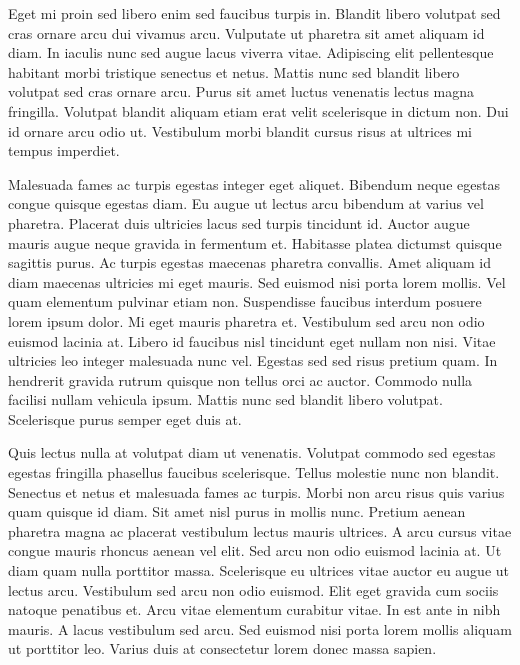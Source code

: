 \documentclass[11pt,a4paper]{article}
\begin{document}
Eget mi proin sed libero enim sed faucibus turpis in. Blandit libero volutpat sed cras ornare arcu dui vivamus arcu. Vulputate ut pharetra sit amet aliquam id diam. In iaculis nunc sed augue lacus viverra vitae. Adipiscing elit pellentesque habitant morbi tristique senectus et netus. Mattis nunc sed blandit libero volutpat sed cras ornare arcu. Purus sit amet luctus venenatis lectus magna fringilla. Volutpat blandit aliquam etiam erat velit scelerisque in dictum non. Dui id ornare arcu odio ut. Vestibulum morbi blandit cursus risus at ultrices mi tempus imperdiet.

Malesuada fames ac turpis egestas integer eget aliquet. Bibendum neque egestas congue quisque egestas diam. Eu augue ut lectus arcu bibendum at varius vel pharetra. Placerat duis ultricies lacus sed turpis tincidunt id. Auctor augue mauris augue neque gravida in fermentum et. Habitasse platea dictumst quisque sagittis purus. Ac turpis egestas maecenas pharetra convallis. Amet aliquam id diam maecenas ultricies mi eget mauris. Sed euismod nisi porta lorem mollis. Vel quam elementum pulvinar etiam non. Suspendisse faucibus interdum posuere lorem ipsum dolor. Mi eget mauris pharetra et. Vestibulum sed arcu non odio euismod lacinia at. Libero id faucibus nisl tincidunt eget nullam non nisi. Vitae ultricies leo integer malesuada nunc vel. Egestas sed sed risus pretium quam. In hendrerit gravida rutrum quisque non tellus orci ac auctor. Commodo nulla facilisi nullam vehicula ipsum. Mattis nunc sed blandit libero volutpat. Scelerisque purus semper eget duis at.

Quis lectus nulla at volutpat diam ut venenatis. Volutpat commodo sed egestas egestas fringilla phasellus faucibus scelerisque. Tellus molestie nunc non blandit. Senectus et netus et malesuada fames ac turpis. Morbi non arcu risus quis varius quam quisque id diam. Sit amet nisl purus in mollis nunc. Pretium aenean pharetra magna ac placerat vestibulum lectus mauris ultrices. A arcu cursus vitae congue mauris rhoncus aenean vel elit. Sed arcu non odio euismod lacinia at. Ut diam quam nulla porttitor massa. Scelerisque eu ultrices vitae auctor eu augue ut lectus arcu. Vestibulum sed arcu non odio euismod. Elit eget gravida cum sociis natoque penatibus et. Arcu vitae elementum curabitur vitae. In est ante in nibh mauris. A lacus vestibulum sed arcu. Sed euismod nisi porta lorem mollis aliquam ut porttitor leo. Varius duis at consectetur lorem donec massa sapien.
\end{document}
